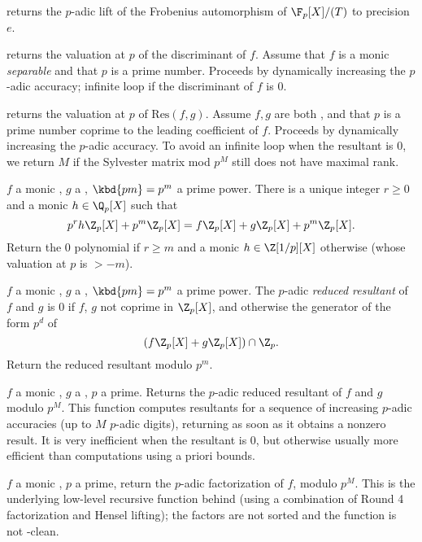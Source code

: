  returns the $p$-adic lift
of the Frobenius automorphism of $\F_p[X]/(T)$ to precision $e$.

 returns the valuation at $p$ of the
discriminant of $f$. Assume that $f$ is a monic \emph{separable} 
and that $p$ is a prime number. Proceeds by dynamically increasing the
$p$-adic accuracy; infinite loop if the discriminant of $f$ is
$0$.

 returns the
valuation at $p$ of $\text{Res}(f,g)$. Assume $f,g$ are both ,
and that $p$ is a prime number coprime to the leading coefficient of $f$.
Proceeds by dynamically increasing the $p$-adic accuracy.
To avoid an infinite loop when the resultant is $0$, we return $M$ if
the Sylvester matrix mod $p^M$ still does not have maximal rank.

 $f$ a monic ,
$g$ a , $\kbd{pm} = p^m$ a prime power. There is a unique integer
$r\geq 0$ and a monic $h\in \Q_p[X]$ such that
$$p^rh\Z_p[X] + p^m\Z_p[X] = f\Z_p[X] + g\Z_p[X] + p^m\Z_p[X].$$
Return the $0$ polynomial if $r\geq m$ and a monic $h\in\Z[1/p][X]$ otherwise
(whose valuation at $p$ is $> -m$).

 $f$ a monic
, $g$ a , $\kbd{pm} = p^m$ a prime power. The $p$-adic
\emph{reduced resultant} of $f$ and $g$ is
$0$ if $f$, $g$ not coprime in $\Z_p[X]$, and otherwise the generator of the
form $p^d$ of
$$ (f\Z_p[X] + g\Z_p[X])\cap \Z_p. $$
Return the reduced resultant modulo $p^m$.

 $f$
a monic , $g$ a , $p$ a prime. Returns
the $p$-adic reduced resultant of $f$ and $g$ modulo $p^M$. This function
computes resultants for a sequence of increasing $p$-adic accuracies
(up to $M$ $p$-adic digits), returning as soon as it obtains a nonzero
result. It is very inefficient when the resultant is $0$, but otherwise
usually more efficient than computations using a priori bounds.

 $f$ a monic
, $p$ a prime, return the $p$-adic factorization of $f$, modulo
$p^M$. This is the underlying low-level recursive function behind
 (using a combination of Round 4 factorization and Hensel
lifting); the factors are not sorted and the function is not
-clean.

